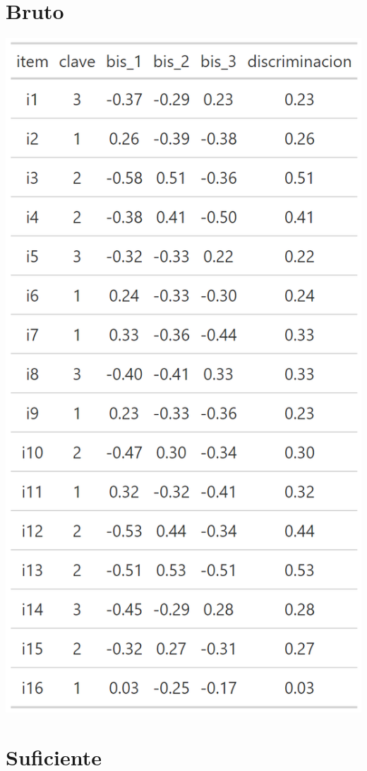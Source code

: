 \documentclass[
  letterpaper,
  DIV=11,
  numbers=noendperiod]{scrreprt}
\begin{document}
\section{Bruto}

\begin{center}
\includegraphics[width=0.6\linewidth,height=\textheight,keepaspectratio]{images/teoria_clasica_disc_blank.png}
\end{center}

\section{Suficiente}
\end{document}
